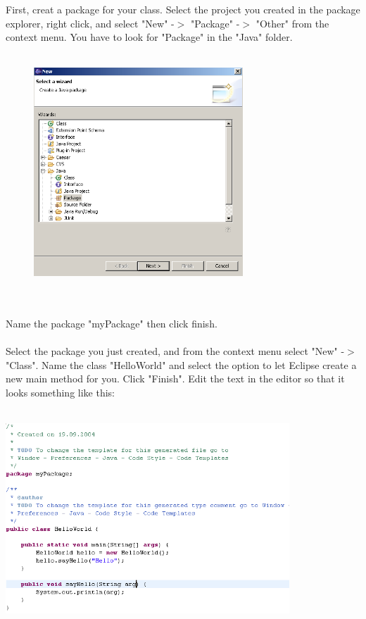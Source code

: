 
First, creat a package for your class.  Select the project you created in the package explorer, right click, and select
"New" -$>$ "Package" -$>$ "Other" from the context menu. You have to look for "Package" in the "Java" folder.\\\\
\begin{figure}[htbp]
	\centering
		\includegraphics[width=0.70\textwidth]{images/package.png}
	\label{fig:package}
\end{figure}\\\\
Name the package "myPackage" then click finish.\\\\
Select the package you just created, and from the context menu select "New" -$>$ "Class". Name the
class "HelloWorld" and select the option to let Eclipse create a new main method for you. Click "Finish".\newpage
Edit the text in the editor so that it looks something like this:\\\\
\begin{center}
	\includegraphics[width=0.80\textwidth]{images/code.png}
\end{center}
	
